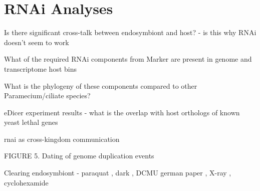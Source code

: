 \graphicspath{{chapters/7.Chapter_5/figures}}

\chapter{RNAi Analyses}

Is there significant cross-talk between endosymbiont and host? - is this why RNAi doesn't seem to work

What of the required RNAi components from Marker are present in genome and transcriptome host bins

What is the phylogeny of these components compared to other Paramecium/ciliate species?

eDicer experiment results - what is the overlap with host orthologs of known yeast lethal genes

rnai as cross-kingdom communication \citep{Weiberg2015}



FIGURE 5. Dating of genome duplication events







Clearing endosymbiont - paraquat \citep{Hosoya1995a}, dark \citep{Karakashian1963}, DCMU german paper \citep{Reisser1976},
X-ray \citep{Wichterman1948}, cyclohexamide \citep{Weis1984,Kodama2007}






